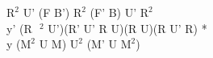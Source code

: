 $\text{R}^2$ U' (F B') $\text{R}^2$ (F' B) U' $\text{R}^2$\\
y' (R$\text{ }^2$ U')(R' U' R U)(R U)(R U' R) *\\
y ($\text{M}^2$ U M) $\text{U}^2$ (M' U $\text{M}^2$)\\
